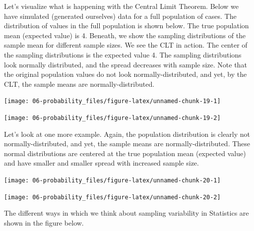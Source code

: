 \documentclass[
]{book}
\begin{document}
Let's visualize what is happening with the Central Limit Theorem. Below we have simulated (generated ourselves) data for a full population of cases. The distribution of values in the full population is shown below. The true population mean (expected value) is 4. Beneath, we show the sampling distributions of the sample mean for different sample sizes. We see the CLT in action. The center of the sampling distributions is the expected value 4. The sampling distributions look normally distributed, and the spread decreases with sample size. Note that the original population values do not look normally-distributed, and yet, by the CLT, the sample means are normally-distributed.

\begin{center}\texttt{[image: 06-probability\_files/figure-latex/unnamed-chunk-19-1]} \end{center}

\begin{center}\texttt{[image: 06-probability\_files/figure-latex/unnamed-chunk-19-2]} \end{center}

Let's look at one more example. Again, the population distribution is clearly not normally-distributed, and yet, the sample means are normally-distributed. These normal distributions are centered at the true population mean (expected value) and have smaller and smaller spread with increased sample size.

\begin{center}\texttt{[image: 06-probability\_files/figure-latex/unnamed-chunk-20-1]} \end{center}

\begin{center}\texttt{[image: 06-probability\_files/figure-latex/unnamed-chunk-20-2]} \end{center}

The different ways in which we think about sampling variability in Statistics are shown in the figure below.
\end{document}
